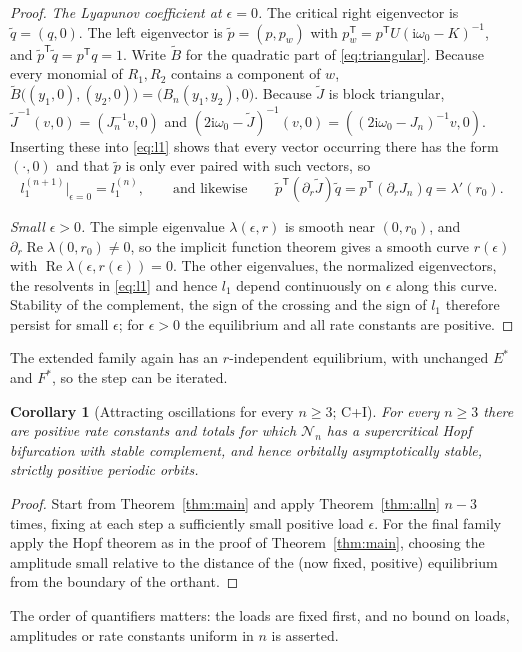 \documentclass[11pt,a4paper]{article}
\theoremstyle{plain}
\newtheorem{corollary}[theorem]{Corollary}
\theoremstyle{definition}
\theoremstyle{remark}
\newcommand{\ii}{\mathrm i}
\newcommand{\T}{\mathsf T}
\newcommand{\cN}{\mathcal N}
\DeclareMathOperator{\Ree}{Re}
\newcommand{\evC}{\textsf{C}}
\newcommand{\evI}{\textsf{I}}
\begin{document}
\begin{proof}
\emph{The Lyapunov coefficient at $\epsilon=0$.} The critical right eigenvector is $\tilde q=(q,0)$. The left eigenvector is $\tilde p=(p,p_w)$ with $p_w^{\T}=p^{\T}U(\ii\omega_0-K)^{-1}$, and $\tilde p^{\T}\tilde q=p^{\T}q=1$. Write $\tilde B$ for the quadratic part of \eqref{eq:triangular}. Because every monomial of $R_1,R_2$ contains a component of $w$, $\tilde B\bigl((y_1,0),(y_2,0)\bigr)=\bigl(B_n(y_1,y_2),0\bigr)$. Because $\tilde J$ is block triangular, $\tilde J^{-1}(v,0)=(J_n^{-1}v,0)$ and $(2\ii\omega_0-\tilde J)^{-1}(v,0)=((2\ii\omega_0-J_n)^{-1}v,0)$. Inserting these into \eqref{eq:l1} shows that every vector occurring there has the form $(\cdot,0)$ and that $\tilde p$ is only ever paired with such vectors, so
\[
 l_1^{(n+1)}\big|_{\epsilon=0}=l_1^{(n)} ,\qquad\text{and likewise}\qquad \tilde p^{\T}(\partial_r\tilde J)\tilde q=p^{\T}(\partial_rJ_n)q=\lambda'(r_0).
\]

\emph{Small $\epsilon>0$.} The simple eigenvalue $\lambda(\epsilon,r)$ is smooth near $(0,r_0)$, and $\partial_r\Ree\lambda(0,r_0)\ne0$, so the implicit function theorem gives a smooth curve $r(\epsilon)$ with $\Ree\lambda(\epsilon,r(\epsilon))=0$. The other eigenvalues, the normalized eigenvectors, the resolvents in \eqref{eq:l1} and hence $l_1$ depend continuously on $\epsilon$ along this curve. Stability of the complement, the sign of the crossing and the sign of $l_1$ therefore persist for small $\epsilon$; for $\epsilon>0$ the equilibrium and all rate constants are positive.
\end{proof}

The extended family again has an $r$-independent equilibrium, with unchanged $E^*$ and $F^*$, so the step can be iterated.

\begin{corollary}[Attracting oscillations for every $n\ge3$; \evC+\evI]\label{cor:alln}
For every $n\ge3$ there are positive rate constants and totals for which $\cN_n$ has a supercritical Hopf bifurcation with stable complement, and hence orbitally asymptotically stable, strictly positive periodic orbits.
\end{corollary}
\begin{proof}
Start from Theorem~\ref{thm:main} and apply Theorem~\ref{thm:alln} $n-3$ times, fixing at each step a sufficiently small positive load $\epsilon$. For the final family apply the Hopf theorem as in the proof of Theorem~\ref{thm:main}, choosing the amplitude small relative to the distance of the (now fixed, positive) equilibrium from the boundary of the orthant.
\end{proof}
The order of quantifiers matters: the loads are fixed first, and no bound on loads, amplitudes or rate constants uniform in $n$ is asserted.
\end{document}
